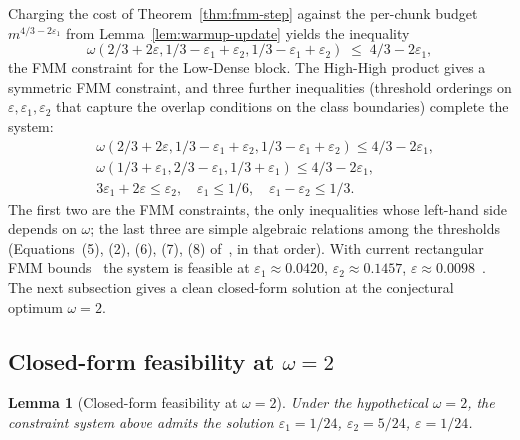 \documentclass[sigconf,nonacm]{acmart}
\theoremstyle{plain}
\newtheorem{lemma}[theorem]{Lemma}
\theoremstyle{definition}
\newcommand{\rfmm}[3]{\omega(#1,#2,#3)}
\begin{document}
Charging the cost of Theorem~\ref{thm:fmm-step} against the
per-chunk budget $m^{4/3-2\varepsilon_1}$ from
Lemma~\ref{lem:warmup-update} yields the inequality
\begin{equation}\label{eq:warmup-fmm}
\rfmm{2/3+2\varepsilon}{1/3-\varepsilon_1+\varepsilon_2}{1/3-\varepsilon_1+\varepsilon_2}
\;\le\; 4/3 - 2\varepsilon_1,
\end{equation}
the FMM constraint for the Low-Dense block. The High-High product
gives a symmetric FMM constraint, and three further inequalities
(threshold orderings on $\varepsilon, \varepsilon_1, \varepsilon_2$
that capture the overlap conditions on the class boundaries) complete the
system:
\begin{align*}
&\rfmm{2/3+2\varepsilon}{1/3-\varepsilon_1+\varepsilon_2}{1/3-\varepsilon_1+\varepsilon_2}
   \le 4/3 - 2\varepsilon_1, \\
&\rfmm{1/3+\varepsilon_1}{2/3-\varepsilon_1}{1/3+\varepsilon_1}
   \le 4/3 - 2\varepsilon_1, \\
&3\varepsilon_1 + 2\varepsilon \le \varepsilon_2, \quad
  \varepsilon_1 \le 1/6, \quad
  \varepsilon_1 - \varepsilon_2 \le 1/3.
\end{align*}
The first two are the FMM constraints, the only inequalities
whose left-hand side depends on $\omega$; the last three are simple
algebraic relations among the thresholds (Equations~(5), (2), (6),
(7), (8) of~\cite[\S3.4]{AssadiShah25}, in that order). With current
rectangular FMM bounds~\cite{ADW25} the system is feasible at
$\varepsilon_1 \approx 0.0420$, $\varepsilon_2 \approx 0.1457$,
$\varepsilon \approx 0.0098$~\cite[App.~B]{AssadiShah25}. The next
subsection gives a clean closed-form solution at the conjectural
optimum $\omega = 2$.

\subsection{Closed-form feasibility at \texorpdfstring{$\omega = 2$}{omega = 2}}
\label{sec:fmm:closed-form}

\begin{lemma}[Closed-form feasibility at $\omega = 2$]
\label{lem:feasibility}
Under the hypothetical $\omega = 2$, the constraint system above admits the solution
$\varepsilon_1 = 1/24$, $\varepsilon_2 = 5/24$, $\varepsilon = 1/24$.
\end{lemma}
\end{document}
